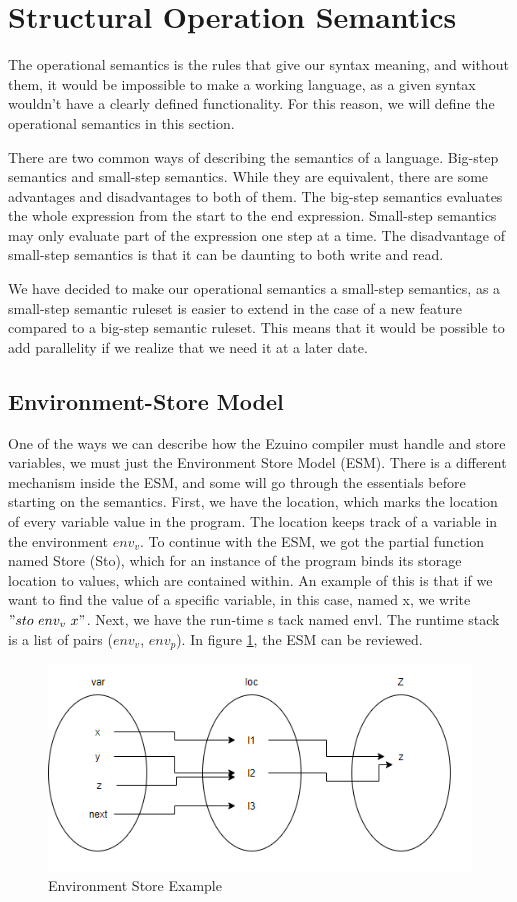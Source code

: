 \section{Structural Operation Semantics}
The operational semantics is the rules that give our syntax meaning, and without them, it would be impossible to make a working language, as a given syntax wouldn't have a clearly defined functionality. For this reason, we will define the operational semantics in this section.

There are two common ways of describing the semantics of a language. Big-step semantics and small-step semantics. While they are equivalent, there are some advantages and disadvantages to both of them. The big-step semantics evaluates the whole expression from the start to the end expression. Small-step semantics may only evaluate part of the expression one step at a time. The disadvantage of small-step semantics is that it can be daunting to both write and read.

We have decided to make our operational semantics a small-step semantics, as a small-step semantic ruleset is easier to extend in the case of a new feature compared to a big-step semantic ruleset. This means that it would be possible to add parallelity if we realize that we need it at a later date.

\subsection{Environment-Store Model}
One of the ways we can describe how the Ezuino compiler must handle and store variables, we must just the Environment Store Model (ESM). There is a different mechanism inside the ESM, and some will go through the essentials before starting on the semantics. First, we have the location, which marks the location of every variable value in the program. The location keeps track of a variable in the environment $env_v$.
To continue with the ESM, we got the partial function named Store (Sto), which for an instance of the program binds its storage location to values, which are contained within. An example of this is that if we want to find the value of a specific variable, in this case, named x, we write $"sto \ env_v \ x"$.
Next, we have the run-time s tack named envl. The runtime stack is a list of pairs ($env_v$, $env_p$).
In figure \ref{evnstoreexmp}, the ESM can be reviewed.
\begin{figure}[H]
\centering
\includegraphics[scale=0.75]{figures/evnstore.png}
\caption{Environment Store Example}
\label{evnstoreexmp}
\end{figure}



